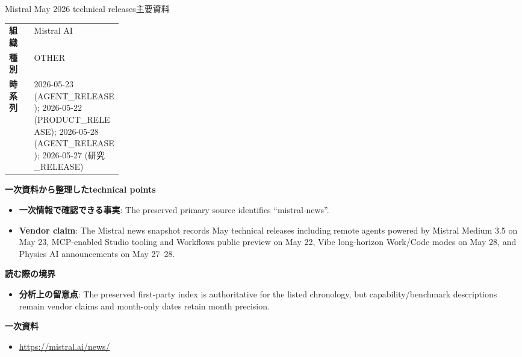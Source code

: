 \begin{technicalnote}{Mistral May 2026 technical releases}{主要資料}
\begin{tabularx}{\linewidth}{@{}>{\bfseries}p{0.22\linewidth}X@{}}
組織 & Mistral AI \\
種別 & OTHER \\
時系列 & 2026-05-23 (AGENT\_RELEASE); 2026-05-22 (PRODUCT\_RELEASE); 2026-05-28 (AGENT\_RELEASE); 2026-05-27 (研究\_RELEASE) \\
\end{tabularx}
\smallskip
{\bfseries 一次資料から整理したtechnical points}
\begin{itemize}[leftmargin=1.5em,itemsep=0.35em]
\item \textbf{一次情報で確認できる事実}: The preserved primary source identifies “mistral-news”.
\item \textbf{Vendor claim}: The Mistral news snapshot records May technical releases including remote agents powered by Mistral Medium 3.5 on May 23, MCP-enabled Studio tooling and Workflows public preview on May 22, Vibe long-horizon Work/Code modes on May 28, and Physics AI announcements on May 27–28.
\end{itemize}
{\bfseries 読む際の境界}
\begin{itemize}[leftmargin=1.5em,itemsep=0.35em]
\item \textbf{分析上の留意点}: The preserved first-party index is authoritative for the listed chronology, but capability/benchmark descriptions remain vendor claims and month-only dates retain month precision.
\end{itemize}
{\bfseries 一次資料}
\begingroup\sloppy
\begin{itemize}[leftmargin=1.5em,itemsep=0.25em]
\item {\scriptsize\url{https://mistral.ai/news/}}
\end{itemize}
\endgroup
\end{technicalnote}
\medskip

